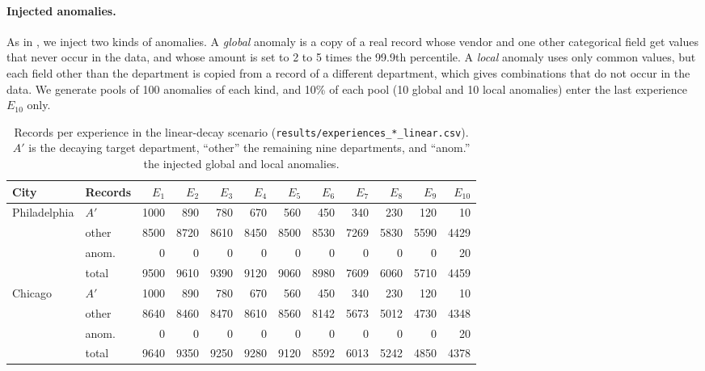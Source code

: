 \documentclass{article} %
\begin{document}
\paragraph{Injected anomalies.}
As in \citet{hemati2022continual}, we inject two kinds of anomalies. A
\emph{global} anomaly is a copy of a real record whose vendor and one other
categorical field get values that never occur in the data, and whose amount is
set to 2 to 5 times the 99.9th percentile. A \emph{local} anomaly uses only
common values, but each field other than the department is copied from a
record of a different department, which gives combinations that do not occur
in the data. We generate pools of 100 anomalies of each kind, and 10\% of each
pool (10 global and 10 local anomalies) enter the last experience $E_{10}$ only.

\begin{table}[t]
\centering\small
\setlength{\tabcolsep}{4pt}
\caption{Records per experience in the linear-decay scenario
(\texttt{results/experiences\_*\_linear.csv}). $A'$ is the decaying target
department, ``other'' the remaining nine departments, and ``anom.'' the
injected global and local anomalies.}
\label{tab:experiences}
\begin{tabular}{llrrrrrrrrrr}
\toprule
City & Records & $E_1$ & $E_2$ & $E_3$ & $E_4$ & $E_5$ & $E_6$ & $E_7$ & $E_8$ & $E_9$ & $E_{10}$ \\
\midrule
Philadelphia & $A'$  & 1000 & 890 & 780 & 670 & 560 & 450 & 340 & 230 & 120 & 10 \\
             & other & 8500 & 8720 & 8610 & 8450 & 8500 & 8530 & 7269 & 5830 & 5590 & 4429 \\
             & anom. & 0 & 0 & 0 & 0 & 0 & 0 & 0 & 0 & 0 & 20 \\
             & total & 9500 & 9610 & 9390 & 9120 & 9060 & 8980 & 7609 & 6060 & 5710 & 4459 \\
\midrule
Chicago      & $A'$  & 1000 & 890 & 780 & 670 & 560 & 450 & 340 & 230 & 120 & 10 \\
             & other & 8640 & 8460 & 8470 & 8610 & 8560 & 8142 & 5673 & 5012 & 4730 & 4348 \\
             & anom. & 0 & 0 & 0 & 0 & 0 & 0 & 0 & 0 & 0 & 20 \\
             & total & 9640 & 9350 & 9250 & 9280 & 9120 & 8592 & 6013 & 5242 & 4850 & 4378 \\
\bottomrule
\end{tabular}
\end{table}
\end{document}
